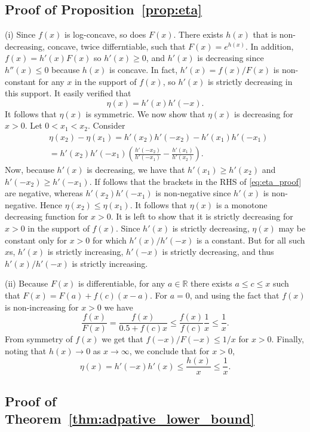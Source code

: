 \documentclass[letterpaper, conference, 11pt]{IEEEtran}      %
\begin{document}
\subsection{Proof of Proposition~\ref{prop:eta}}
(i) Since $f(x)$ is log-concave, so does $F(x)$. There exists $h(x)$ that is non-decreasing, concave, twice differntiable, such that $F(x) = e^{h(x)}$. In addition, $f(x) = h'(x)F(x)$ so $h'(x) \geq 0$, and $h'(x)$ is decreasing since $h''(x) \leq 0$ because $h(x)$ is concave. In fact, $h'(x) = f(x)/F(x)$ is non-constant for any $x$ in the support of $f(x)$, so $h'(x)$ is strictly decreasing in this support. It easily verified that
\[
\eta(x) = h'(x) h'(-x).
\]
It follows that $\eta(x)$ is symmetric. We now show that $\eta(x)$ is decreasing for $x>0$. Let $0<x_1 < x_2$. Consider
\begin{align}
& \eta(x_2) - \eta(x_1) = h'(x_2)h'(-x_2) - h'(x_1)h'(-x_1) \nonumber \\
&  =h'(x_2)h'(-x_1) \left(\frac{h'(-x_2)}{h'(-x_1)} - \frac{h'(x_1)}{h'(x_2)}  \right). \label{eq:eta_proof}
\end{align}
Now, because $h'(x)$ is decreasing, we have that $h'(x_1) \geq h'(x_2)$ and $h'(-x_2) \geq  h'(-x_1)$. If follows that the brackets in the RHS of \eqref{eq:eta_proof} are negative, whereas $h'(x_2) h'(-x_1)$ is non-negative since $h'(x)$ is non-negative. Hence $\eta(x_2) \leq \eta(x_1)$. It follows that $\eta(x)$ is a monotone decreasing function for $x>0$. It is left to show that it is strictly decreasing for $x>0$ in the support of $f(x)$. Since $h'(x)$ is strictly decreasing, $\eta(x)$ may be constant only for $x>0$ for which $h'(x)/h'(-x)$ is a constant. But for all such $x$s, $h'(x)$ is strictly increasing, $h'(-x)$ is strictly decreasing, and thus $h'(x)/h'(-x)$ is strictly increasing. \par
(ii) Because $F(x)$ is differentiable, for any $a \in \mathbb R$ there exists $a\leq c \leq x$ such that 
$F(x) = F(a) + f(c) (x-a)$. For $a=0$, and using the fact that $f(x)$ is non-increasing for $x>0$ we have
\[
\frac{f(x)}{F(x)} = \frac{f(x)}{0.5 + f(c) x }  \leq \frac{f(x)}{f(c)} \frac{1}{x} \leq \frac{1}{x}.  
\]
From symmetry of $f(x)$ we get that $f(-x)/F(-x) \leq 1/x$ for $x>0$. Finally, noting that $h(x)\rightarrow 0$ as $x\rightarrow \infty$, we conclude that for $x>0$, 
\[
\eta(x) = h'(-x)h'(x) \leq \frac{h(x)}{x} \leq \frac{1}{x}. 
\]

\subsection*{Proof of Theorem~\ref{thm:adpative_lower_bound}}
\end{document}
